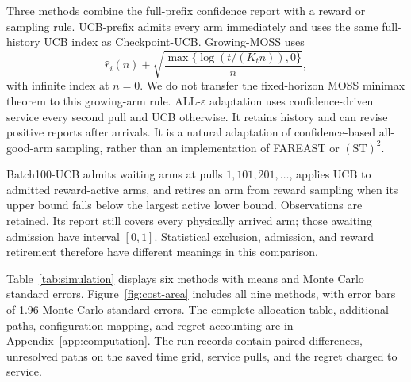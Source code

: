 \documentclass[11pt]{article}
\theoremstyle{remark}
\begin{document}
Three methods combine the full-prefix confidence report with a reward or
sampling rule. UCB-prefix admits every arm immediately and uses the same
full-history UCB index as Checkpoint-UCB. Growing-MOSS uses
\[
 \hat r_i(n)+\sqrt{\frac{\max\{\log(t/(K_tn)),0\}}{n}},
\]
with infinite index at $n=0$. We do not transfer the fixed-horizon MOSS
minimax theorem to this growing-arm rule. ALL-$\varepsilon$ adaptation
uses confidence-driven service every second pull and UCB otherwise. It
retains history and can revise positive reports after arrivals. It is a
natural adaptation of confidence-based all-good-arm sampling, rather than
an implementation of FAREAST or $(\mathrm{ST})^2$.

Batch100-UCB admits waiting arms at pulls $1,101,201,\ldots$, applies UCB
to admitted reward-active arms, and retires an arm from reward sampling
when its upper bound falls below the largest active lower bound.
Observations are retained. Its report still covers every physically
arrived arm; those awaiting admission have interval $[0,1]$. Statistical
exclusion, admission, and reward retirement therefore have different
meanings in this comparison.

Table~\ref{tab:simulation} displays six methods with means and Monte Carlo
standard errors. Figure~\ref{fig:cost-area} includes all nine methods, with
error bars of 1.96 Monte Carlo standard errors. The complete allocation
table, additional paths, configuration mapping, and regret accounting are
in Appendix~\ref{app:computation}. The run records contain paired
differences, unresolved paths on the saved time grid, service pulls, and
the regret charged to service.
\end{document}

